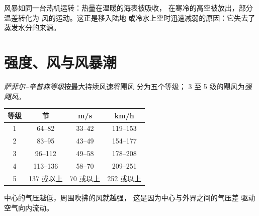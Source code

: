 风暴如同一台热机运转：热量在温暖的海表被吸收，
在寒冷的高空被放出，部分温差转化为
风的运动。这正是移入陆地
或冷水上空时迅速减弱的原因：它失去了
蒸发水分的来源。

\section{强度、风与风暴潮}

\begin{definition}\label{def:g10:storms-and-cyclones:scale}
\emph{萨菲尔–辛普森等级}按最大持续风速将飓风
分为五个等级；
3 至 5 级的飓风为\emph{强飓风}。
\end{definition}

\begin{center}
\small
\begin{tabular}{cccc}
\hline
等级 & 节 & \unit{m/s} & \unit{km/h} \\
\hline
1 & 64--82 & 33--42 & 119--153 \\
2 & 83--95 & 43--49 & 154--177 \\
3 & 96--112 & 49--58 & 178--208 \\
4 & 113--136 & 58--70 & 209--251 \\
5 & 137 或以上 & 70 或以上 & 252 或以上 \\
\hline
\end{tabular}
\end{center}

中心的气压越低，周围吹拂的风就越强，
这是因为中心与外界之间的气压差
驱动空气向内流动。

